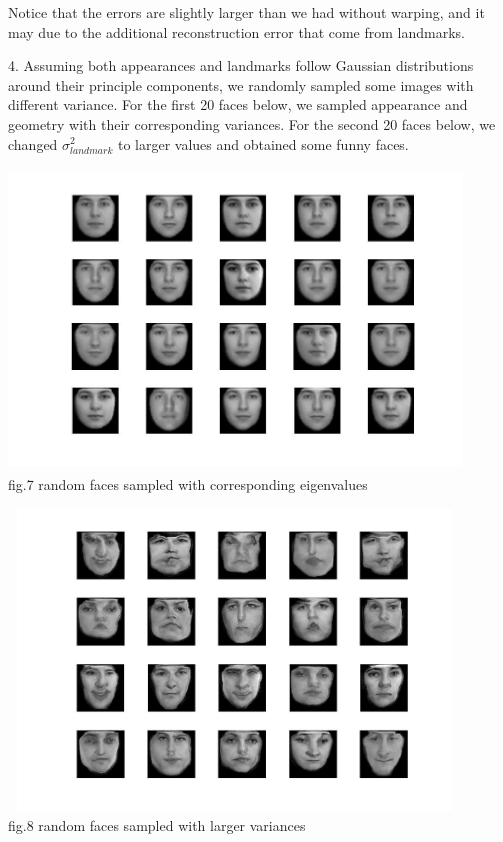 \documentclass[12pt]{article}
\newenvironment{problem}[2][Part]{\begin{trivlist}
\item[\hskip \labelsep {\bfseries #1}\hskip \labelsep {\bfseries #2}]}{\end{trivlist}}
\begin{document}
\begin{problem}{1. ASM and AAM model for face reconstruction}
\begin{center}
\end{center}
Notice that the errors are slightly larger than we had without warping, and it may due to the additional reconstruction error that come from landmarks.
\item{4.}
		Assuming both appearances and landmarks follow Gaussian distributions around their principle components, we randomly sampled some images with different variance. For the first 20 faces below, we sampled appearance and geometry with their corresponding variances. For the second 20 faces below, we changed $\sigma_{landmark}^2$ to larger values and obtained some funny faces.
\begin{center}
		\includegraphics[height=8cm, width=12cm]{rand_face_true.jpg}{\\fig.7 random faces sampled with corresponding eigenvalues}
\end{center}
\begin{center}
		\includegraphics[height=8cm, width=12cm]{rand_face_funny.jpg}{\\fig.8 random faces sampled with larger variances}
\end{center}
\end{problem}
\end{document}
